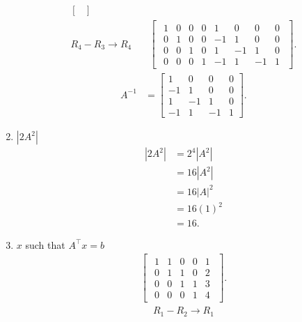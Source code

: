 \documentclass{zc-ust-hw}
\begin{document}
\begin{enumerate}[label=\roman*.]
\begin{align}
\begin{bmatrix}
      \end{bmatrix} \\
      R_4 - R_3 \rightarrow R_4
      &\quad
      \begin{bmatrix} 
        \begin{array}{cccc|cccc}
          1 & 0 & 0 & 0 & 1  & 0  & 0  & 0 \\
          0 & 1 & 0 & 0 & -1 & 1  & 0  & 0 \\
          0 & 0 & 1 & 0 & 1  & -1 & 1  & 0 \\
          0 & 0 & 0 & 1 & -1 & 1  & -1 & 1
        \end{array}
      \end{bmatrix}
    .\end{align}
    \begin{align}
      A^{-1} &=
      \begin{bmatrix} 
        1  & 0  & 0  & 0 \\
        -1 & 1  & 0  & 0 \\
        1  & -1 & 1  & 0 \\
        -1 & 1  & -1 & 1
      \end{bmatrix} 
    .\end{align}
  \item $\left|2A^2\right|$
    \begin{align}
      \left|2A^2\right| &= 2^4 \left|A^2\right| \\
                        &= 16 \left|A^2\right| \\
                        &= 16 \left|A\right|^2 \\
                        &= 16 \left( 1 \right)^2 \\
                        &= 16
    .\end{align}
  \item $x$ such that $A^\intercal x=b$
    \begin{align}
      \begin{bmatrix} 
        \begin{array}{cccc|c}
          1 & 1 & 0 & 0 & 1 \\
          0 & 1 & 1 & 0 & 2 \\
          0 & 0 & 1 & 1 & 3 \\
          0 & 0 & 0 & 1 & 4
        \end{array}
      \end{bmatrix}
    .\end{align}
    \begin{align}
      R_1 - R_2 \rightarrow R_1

\end{align}
\end{enumerate}
\end{document}

